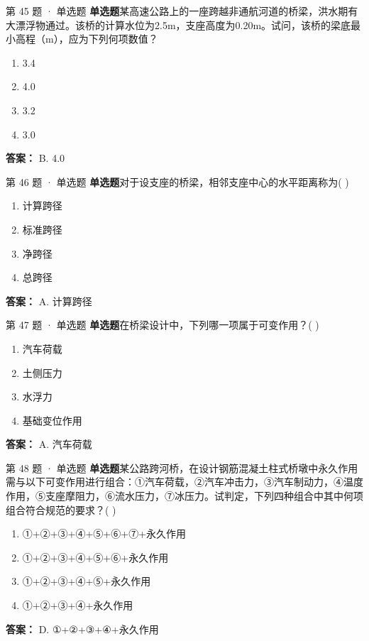 \documentclass[UTF8,zihao=-4,openany]{ctexbook}
\newenvironment{choices}{\begin{enumerate}[label=\Alph*.,leftmargin=9mm,labelsep=3mm,itemsep=2pt,topsep=4pt]}{\end{enumerate}}
\newcommand{\qtype}[1]{\textcolor{brand}{\sffamily\bfseries #1}}
\begin{document}
\begin{questionbox}{第 45 题 · 单选题}
\qtype{单选题}\quad 某高速公路上的一座跨越非通航河道的桥梁，洪水期有大漂浮物通过。该桥的计算水位为2.5m，支座高度为0.20m。试问，该桥的梁底最小高程（m），应为下列何项数值？
\begin{choices}
\item 3.4
\item 4.0
\item 3.2
\item 3.0
\end{choices}
\begin{answerbox}
\textbf{答案：} B. 4.0
\end{answerbox}
\end{questionbox}

\begin{questionbox}{第 46 题 · 单选题}
\qtype{单选题}\quad 对于设支座的桥梁，相邻支座中心的水平距离称为( )
\begin{choices}
\item 计算跨径
\item 标准跨径
\item 净跨径
\item 总跨径
\end{choices}
\begin{answerbox}
\textbf{答案：} A. 计算跨径
\end{answerbox}
\end{questionbox}

\begin{questionbox}{第 47 题 · 单选题}
\qtype{单选题}\quad 在桥梁设计中，下列哪一项属于可变作用？( )
\begin{choices}
\item 汽车荷载
\item 土侧压力
\item 水浮力
\item 基础变位作用
\end{choices}
\begin{answerbox}
\textbf{答案：} A. 汽车荷载
\end{answerbox}
\end{questionbox}

\begin{questionbox}{第 48 题 · 单选题}
\qtype{单选题}\quad 某公路跨河桥，在设计钢筋混凝土柱式桥墩中永久作用需与以下可变作用进行组合：①汽车荷载，②汽车冲击力，③汽车制动力，④温度作用，⑤支座摩阻力，⑥流水压力，⑦冰压力。试判定，下列四种组合中其中何项组合符合规范的要求？( )
\begin{choices}
\item ①+②+③+④+⑤+⑥+⑦+永久作用
\item ①+②+③+④+⑤+⑥+永久作用
\item ①+②+③+④+⑤+永久作用
\item ①+②+③+④+永久作用
\end{choices}
\begin{answerbox}
\textbf{答案：} D. ①+②+③+④+永久作用
\end{answerbox}
\end{questionbox}
\end{document}
